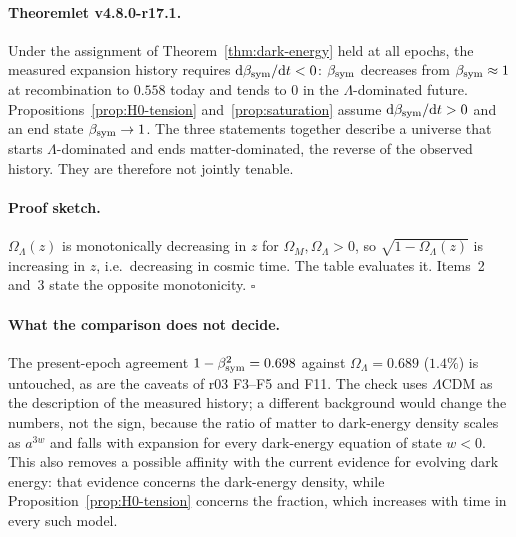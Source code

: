 \paragraph{Theoremlet v4.8.0-r17.1.}
Under the assignment of Theorem~\ref{thm:dark-energy} held at all epochs, the measured expansion history requires
\(\mathrm d\beta_{\mathrm{sym}}/\mathrm dt<0\): \(\beta_{\mathrm{sym}}\) decreases from \(\beta_{\mathrm{sym}}\approx1\) at recombination to \(0.558\) today and
tends to \(0\) in the \(\Lambda\)-dominated future.  Propositions~\ref{prop:H0-tension} and~\ref{prop:saturation}
assume \(\mathrm d\beta_{\mathrm{sym}}/\mathrm dt>0\) and an end state \(\beta_{\mathrm{sym}}\to1\).  The three statements together describe a
universe that starts \(\Lambda\)-dominated and ends matter-dominated, the reverse of the observed history.  They are
therefore not jointly tenable.

\paragraph{Proof sketch.}
\(\Omega_\Lambda(z)\) is monotonically decreasing in \(z\) for \(\Omega_M,\Omega_\Lambda>0\), so
\(\sqrt{1-\Omega_\Lambda(z)}\) is increasing in \(z\), i.e.\ decreasing in cosmic time.  The table evaluates it.
Items~2 and~3 state the opposite monotonicity.  \(\square\)

\paragraph{What the comparison does not decide.}
The present-epoch agreement \(1-\beta_{\mathrm{sym}}^2=0.698\) against \(\Omega_\Lambda=0.689\) (\(1.4\%\)) is untouched, as are
the caveats of r03 F3--F5 and F11.  The check uses \(\Lambda\)CDM as the description of the measured history; a
different background would change the numbers, not the sign, because the ratio of matter to dark-energy density
scales as \(a^{3w}\) and falls with expansion for every dark-energy equation of state \(w<0\).  This also removes a possible affinity with the
current evidence for evolving dark energy: that evidence concerns the dark-energy density, while
Proposition~\ref{prop:H0-tension} concerns the fraction, which increases with time in every such model.

